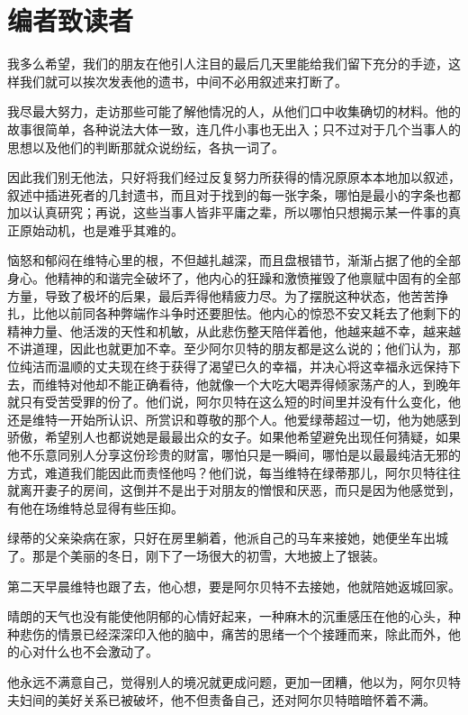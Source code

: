 \documentclass[12pt,oneside]{book}
\begin{document}
\part{编者致读者}
\label{sec-5}
\begin{framed}
我多么希望，我们的朋友在他引人注目的最后几天里能给我们留下充分的手迹，这样我们就可以挨次发表他的遗书，中间不必用叙述来打断了。

我尽最大努力，走访那些可能了解他情况的人，从他们口中收集确切的材料。他的故事很简单，各种说法大体一致，连几件小事也无出入；只不过对于几个当事人的思想以及他们的判断那就众说纷纭，各执一词了。

因此我们别无他法，只好将我们经过反复努力所获得的情况原原本本地加以叙述，叙述中插进死者的几封遗书，而且对于找到的每一张字条，哪怕是最小的字条也都加以认真研究；再说，这些当事人皆非平庸之辈，所以哪怕只想揭示某一件事的真正原始动机，也是难乎其难的。

恼怒和郁闷在维特心里的根，不但越扎越深，而且盘根错节，渐渐占据了他的全部身心。他精神的和谐完全破坏了，他内心的狂躁和激愤摧毁了他禀赋中固有的全部方量，导致了极坏的后果，最后弄得他精疲力尽。为了摆脱这种状态，他苦苦挣扎，比他以前同各种弊端作斗争时还要胆怯。他内心的惊恐不安又耗去了他剩下的精神力量、他活泼的天性和机敏，从此悲伤整天陪伴着他，他越来越不幸，越来越不讲道理，因此也就更加不幸。至少阿尔贝特的朋友都是这么说的；他们认为，那位纯洁而温顺的丈夫现在终于获得了渴望已久的幸福，并决心将这幸福永远保持下去，而维特对他却不能正确看待，他就像一个大吃大喝弄得倾家荡产的人，到晚年就只有受苦受罪的份了。他们说，阿尔贝特在这么短的时间里并没有什么变化，他还是维特一开始所认识、所赏识和尊敬的那个人。他爱绿蒂超过一切，他为她感到骄傲，希望别人也都说她是最最出众的女子。如果他希望避免出现任何猜疑，如果他不乐意同别人分享这份珍贵的财富，哪怕只是一瞬间，哪怕是以最最纯洁无邪的方式，难道我们能因此而责怪他吗？他们说，每当维特在绿蒂那儿，阿尔贝特往往就离开妻子的房间，这倒并不是出于对朋友的憎恨和厌恶，而只是因为他感觉到，有他在场维特总显得有些压抑。

绿蒂的父亲染病在家，只好在房里躺着，他派自己的马车来接她，她便坐车出城了。那是个美丽的冬日，刚下了一场很大的初雪，大地披上了银装。

第二天早晨维特也跟了去，他心想，要是阿尔贝特不去接她，他就陪她返城回家。

晴朗的天气也没有能使他阴郁的心情好起来，一种麻木的沉重感压在他的心头，种种悲伤的情景已经深深印入他的脑中，痛苦的思绪一个个接踵而来，除此而外，他的心对什么也不会激动了。

他永远不满意自己，觉得别人的境况就更成问题，更加一团糟，他以为，阿尔贝特夫妇间的美好关系已被破坏，他不但责备自己，还对阿尔贝特暗暗怀着不满。


\end{framed}
\end{document}
